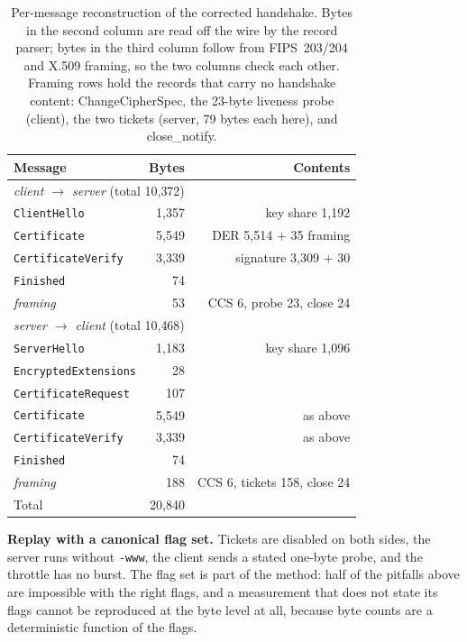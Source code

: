 \documentclass[]{spie}  %
\begin{document}
\begin{table}[h]
\caption{Per-message reconstruction of the corrected handshake. Bytes in
the second column are read off the wire by the record parser; bytes in
the third column follow from FIPS~203/204 and X.509 framing, so the two
columns check each other. Framing rows hold the records that carry no
handshake content: ChangeCipherSpec, the 23-byte liveness probe
(client), the two tickets (server, 79 bytes each here), and
close\_notify.}
\label{tab:messages}
\begin{center}
\begin{tabular}{@{}lrr@{}}
\toprule
Message & Bytes & Contents \\
\midrule
\multicolumn{3}{l}{\emph{client $\to$ server} (total 10{,}372)} \\
\quad \texttt{ClientHello} & 1{,}357 & key share 1{,}192 \\
\quad \texttt{Certificate} & 5{,}549 & DER 5{,}514 $+$ 35 framing \\
\quad \texttt{CertificateVerify} & 3{,}339 & signature 3{,}309 $+$ 30 \\
\quad \texttt{Finished} & 74 & \\
\quad \emph{framing} & 53 & CCS 6, probe 23, close 24 \\
\midrule
\multicolumn{3}{l}{\emph{server $\to$ client} (total 10{,}468)} \\
\quad \texttt{ServerHello} & 1{,}183 & key share 1{,}096 \\
\quad \texttt{EncryptedExtensions} & 28 & \\
\quad \texttt{CertificateRequest} & 107 & \\
\quad \texttt{Certificate} & 5{,}549 & as above \\
\quad \texttt{CertificateVerify} & 3{,}339 & as above \\
\quad \texttt{Finished} & 74 & \\
\quad \emph{framing} & 188 & CCS 6, tickets 158, close 24 \\
\midrule
Total & 20{,}840 & \\
\bottomrule
\end{tabular}
\end{center}
\end{table}

\textbf{Replay with a canonical flag set.} Tickets are disabled on both
sides, the server runs without \texttt{-www}, the client sends a stated
one-byte probe, and the throttle has no burst. The flag set is part of
the method: half of the pitfalls above are impossible with the right
flags, and a measurement that does not state its flags cannot be
reproduced at the byte level at all, because byte counts are a
deterministic function of the flags.
\end{document}
